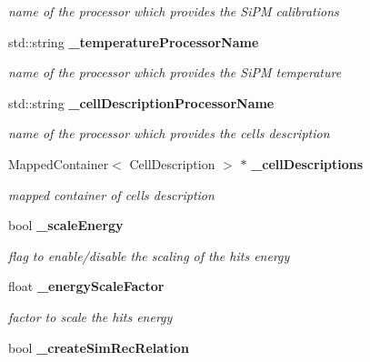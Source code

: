 \begin{DoxyCompactItemize}
\begin{DoxyCompactList}\small\item\em name of the processor which provides the SiPM calibrations \item\end{DoxyCompactList}\item 
std::string {\bf \_\-temperatureProcessorName}\label{classCALICE_1_1SiPMCalibrateProcessor_ad57628decfdca245ff0bc4466e398d2f}

\begin{DoxyCompactList}\small\item\em name of the processor which provides the SiPM temperature \item\end{DoxyCompactList}\item 
std::string {\bf \_\-cellDescriptionProcessorName}\label{classCALICE_1_1SiPMCalibrateProcessor_a7470eb03aa80ec18c2bcb3bff172411d}

\begin{DoxyCompactList}\small\item\em name of the processor which provides the cells description \item\end{DoxyCompactList}\item 
MappedContainer$<$ CellDescription $>$ $\ast$ {\bf \_\-cellDescriptions}\label{classCALICE_1_1SiPMCalibrateProcessor_a008a04e60e994e7f5a60e4752808d4cf}

\begin{DoxyCompactList}\small\item\em mapped container of cells description \item\end{DoxyCompactList}\item 
bool {\bf \_\-scaleEnergy}\label{classCALICE_1_1SiPMCalibrateProcessor_a2d1cc15e62943ab55fe09f85a035e0a8}

\begin{DoxyCompactList}\small\item\em flag to enable/disable the scaling of the hits energy \item\end{DoxyCompactList}\item 
float {\bf \_\-energyScaleFactor}\label{classCALICE_1_1SiPMCalibrateProcessor_a1bb566afa9919856a28d3e0496d67236}

\begin{DoxyCompactList}\small\item\em factor to scale the hits energy \item\end{DoxyCompactList}\item 
bool {\bf \_\-createSimRecRelation}\label{classCALICE_1_1SiPMCalibrateProcessor_a3901432aa67fe2cc8045eb1e33f77c18}


\end{DoxyCompactItemize}
